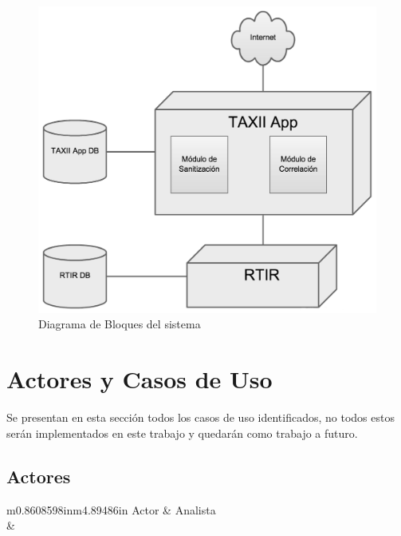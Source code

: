 \begin{figure}[h!]
	\centering
	\includegraphics[scale=0.25]{Analisis22-img/Analisis22-img016.png}
	\caption{Diagrama de Bloques del sistema}
	\label{fig.diagramabloques}
\end{figure}


\newpage

\section{Actores y Casos de Uso}
Se presentan en esta sección todos los casos de uso identificados, no todos estos serán implementados en este trabajo y quedarán como trabajo a futuro.
\subsection{Actores}

\bigskip

\begin{flushleft}
	\tablefirsthead{}
	\tablehead{}
	\tabletail{}
	\tablelasttail{}
	\begin{supertabular}{m{0.8608598in}m{4.89486in}}
		{Actor} &
		{Analista}\\\hline
		 &
		\\
	\end{supertabular}
\end{flushleft}

